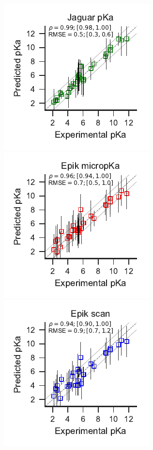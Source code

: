 \documentclass[9pt,lineno,final]{elife}
\begin{document}
\begin{figure}[hbtp]
\centering
{}
\includegraphics[scale=1.2]{closest_pka_jaguar.pdf}
\includegraphics[scale=1.2]{closest_pka_epik_micropka.pdf}
\includegraphics[scale=1.2]{closest_pka_epik_scan.pdf}

\end{figure}
\end{document}

